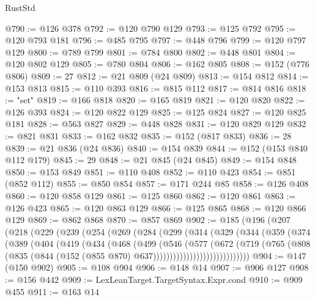 \begin{lexlean}{RustStd}
\begin{coremodule}
@790 := @126 @378
@792 := @120 @790 @129
@793 := @125 @792
@795 := @120 @793 @181
@796 := @485 @795
@797 := @448 @796
@799 := @120 @797 @129
@800 := @789 @799
@801 := @784 @800
@802 := @448 @801
@804 := @120 @802 @129
@805 := @780 @804
@806 := @162 @805
@808 := @152 (@776 @806)
@809 := 27
@812 := @21 @809 (@24 @809)
@813 := @154 @812
@814 := @153 @813
@815 := @110 @393
@816 := @815 @112
@817 := @814 @816
@818 := "set"
@819 := @166 @818
@820 := @165 @819
@821 := @120 @820
@822 := @126 @393
@824 := @120 @822 @129
@825 := @125 @824
@827 := @120 @825 @181
@828 := @563 @827
@829 := @448 @828
@831 := @120 @829 @129
@832 := @821 @831
@833 := @162 @832
@835 := @152 (@817 @833)
@836 := 28
@839 := @21 @836 (@24 @836)
@840 := @154 @839
@844 := @152 (@153 @840 @112 @179)
@845 := 29
@848 := @21 @845 (@24 @845)
@849 := @154 @848
@850 := @153 @849
@851 := @110 @408
@852 := @110 @423
@854 := @851 (@852 @112)
@855 := @850 @854
@857 := @171 @244 @85
@858 := @126 @408
@860 := @120 @858 @129
@861 := @125 @860
@862 := @120 @861
@863 := @126 @423
@865 := @120 @863 @129
@866 := @125 @865
@868 := @120 @866 @129
@869 := @862 @868
@870 := @857 @869
@902 := @185
    (@196
      (@207
        (@218
          (@229
            (@239
              (@254
                (@269
                  (@284
                    (@299
                      (@314
                        (@329
                          (@344
                            (@359
                              (@374
                                (@389
                                  (@404
                                    (@419
                                      (@434
                                        (@468
                                          (@499
                                            (@546
                                              (@577
                                                (@672
                                                  (@719
                                                    (@765
                                                      (@808
                                                        (@835
                                                          (@844
                                                            (@152
                                                              (@855 @870)
                                                              @637)))))))))))))))))))))))))))))
@904 := @147 (@150 @902)
@905 := @108 @904
@906 := @148 @14
@907 := @906 @127
@908 := @156 @442
@909 := LexLeanTarget.TargetSyntax.Expr.cond
@910 := @909 @455
@911 := @163 @14

\end{coremodule}
\end{lexlean}

